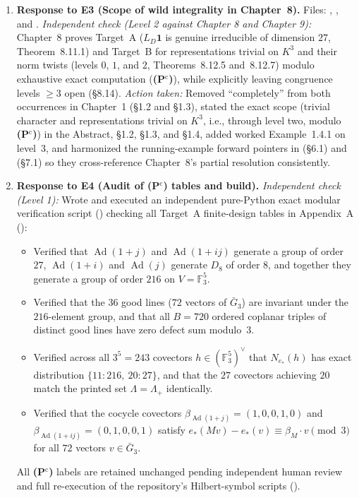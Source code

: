 \documentclass[12pt,letterpaper]{amsart}
\begin{document}
\begin{enumerate}[leftmargin=*,label=\textbf{R\arabic*.}]
\item \textbf{Response to E3 (Scope of wild integrality in Chapter~8).} Files: , , and .
\emph{Independent check (Level 2 against Chapter 8 and Chapter 9):} Chapter~8 proves Target~A ($L_D\mathbf 1$ is genuine irreducible of dimension $27$, Theorem~8.11.1) and Target~B for representations trivial on $K^3$ and their norm twists (levels $0$, $1$, and $2$, Theorems~8.12.5 and~8.12.7) modulo exhaustive exact computation (\textbf{(P$^{\mathrm c}$)}), while explicitly leaving congruence levels $\ge 3$ open (\S8.14).
\emph{Action taken:} Removed ``completely'' from both occurrences in Chapter~1 (\S1.2 and \S1.3), stated the exact scope (trivial character and representations trivial on $K^3$, i.e., through level two, modulo \textbf{(P$^{\mathrm c}$)}) in the Abstract, \S1.2, \S1.3, and \S1.4, added worked Example~1.4.1 on level~$3$, and harmonized the running-example forward pointers in  (\S6.1) and  (\S7.1) so they cross-reference Chapter~8's partial resolution consistently.

\item \textbf{Response to E4 (Audit of \textnormal{\textbf{(P$^{\mathrm c}$)}} tables and build).}
\emph{Independent check (Level 1):} Wrote and executed an independent pure-Python exact modular verification script () checking all Target~A finite-design tables in Appendix~A ():
\begin{itemize}[leftmargin=*]
\item Verified that $\operatorname{Ad}(1+j)$ and $\operatorname{Ad}(1+ij)$ generate a group of order $27$, $\operatorname{Ad}(1+i)$ and $\operatorname{Ad}(j)$ generate $D_8$ of order $8$, and together they generate a group of order $216$ on $V=\mathbb F_3^5$.
\item Verified that the $36$ good lines ($72$ vectors of $\bar G_3$) are invariant under the $216$-element group, and that all $B=720$ ordered coplanar triples of distinct good lines have zero defect sum modulo~$3$.
\item Verified across all $3^5=243$ covectors $h\in (\mathbb F_3^5)^\vee$ that $N_{e_*}(h)$ has exact distribution $\{11:216,\ 20:27\}$, and that the $27$ covectors achieving $20$ match the printed set $\Lambda=\Lambda_+$ identically.
\item Verified that the cocycle covectors $\beta_{\operatorname{Ad}(1+j)}=(1,0,0,1,0)$ and $\beta_{\operatorname{Ad}(1+ij)}=(0,1,0,0,1)$ satisfy $e_*(Mv)-e_*(v)\equiv \beta_M\cdot v\pmod 3$ for all $72$ vectors $v\in\bar G_3$.
\end{itemize}
All \textbf{(P$^{\mathrm c}$)} labels are retained unchanged pending independent human review and full re-execution of the repository's Hilbert-symbol scripts ().
\end{enumerate}
\end{document}
